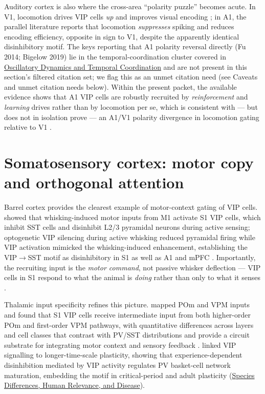 \documentclass[11pt]{article}
\let\origrightarrow\rightarrow
\def\rightarrow{\ensuremath{\origrightarrow}}
\begin{document}
Auditory cortex is also where the cross-area ``polarity puzzle'' becomes acute. In V1, locomotion drives VIP cells \textit{up} and improves visual encoding \citep{Dipoppa2018, Pakan2016}; in A1, the parallel literature reports that locomotion \textit{suppresses} spiking and reduces encoding efficiency, opposite in sign to V1, despite the apparently identical disinhibitory motif. The keys reporting that A1 polarity reversal directly (Fu 2014; Bigelow 2019) lie in the temporal-coordination cluster covered in \href{/oscillatory-dynamics}{Oscillatory Dynamics and Temporal Coordination} and are not present in this section's filtered citation set; we flag this as an unmet citation need (see Caveats and unmet citation needs below). Within the present packet, the available evidence shows that A1 VIP cells are robustly recruited by \textit{reinforcement} and \textit{learning} drives \citep{Pi2013, Takesian2018, Wall2016} rather than by locomotion per se, which is consistent with --- but does not in isolation prove --- an A1/V1 polarity divergence in locomotion gating relative to V1 \citep{Dipoppa2018, Pakan2016}.

\section{Somatosensory cortex: motor copy and orthogonal attention}

Barrel cortex provides the clearest example of motor-context gating of VIP cells. \citet{Lee2013} showed that whisking-induced motor inputs from M1 activate S1 VIP cells, which inhibit SST cells and disinhibit L2/3 pyramidal neurons during active sensing; optogenetic VIP silencing during active whisking reduced pyramidal firing while VIP activation mimicked the whisking-induced enhancement, establishing the VIP\rightarrow SST motif as disinhibitory in S1 as well as A1 and mPFC \citep{Lee2013, Pi2013}. Importantly, the recruiting input is the \textit{motor command}, not passive whisker deflection --- VIP cells in S1 respond to what the animal is \textit{doing} rather than only to what it senses \citep{Lee2013}.

Thalamic input specificity refines this picture. \citet{Sermet2019} mapped POm and VPM inputs and found that S1 VIP cells receive intermediate input from both higher-order POm and first-order VPM pathways, with quantitative differences across layers and cell classes that contrast with PV/SST distributions and provide a circuit substrate for integrating motor context and sensory feedback \citep{Sermet2019, Lee2013}. \citet{Donato2013} linked VIP signalling to longer-time-scale plasticity, showing that experience-dependent disinhibition mediated by VIP activity regulates PV basket-cell network maturation, embedding the motif in critical-period and adult plasticity (\href{/disease-translational}{Species Differences, Human Relevance, and Disease}).
\end{document}
